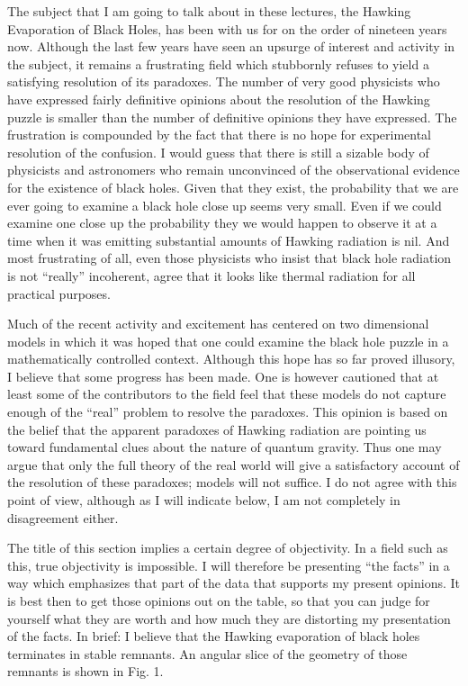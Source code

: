 The subject that I am going to talk about in these lectures, the Hawking
Evaporation of Black Holes, has been with us
for on the order of nineteen years now.  Although the last few years have seen
an upsurge of interest and activity in the subject, it remains a frustrating
field which stubbornly refuses to yield a satisfying resolution of its
paradoxes.
The number of very good physicists who have expressed fairly definitive
opinions
about the resolution of the Hawking puzzle is smaller than the number of
definitive opinions they have expressed.  The frustration is compounded
by the fact that there is no hope for experimental resolution of the confusion.
I would guess that there is still a sizable body of physicists and astronomers
who remain unconvinced of the observational evidence for the existence of
black holes.  Given that they exist, the probability that we are ever
going to examine a black hole close up seems very small.  Even if we could
examine
one close up the probability they we would happen to observe it at a time when
it was emitting substantial amounts of Hawking radiation is nil.  And most
frustrating of
all, even those physicists who insist that black hole radiation is not
 ``really''
incoherent, agree that it looks like thermal radiation for all practical
purposes.

Much of the recent activity and excitement has centered on two dimensional
models
in which it was hoped that one could examine the black hole puzzle in a
mathematically
controlled context.  Although this hope has so far proved illusory, I believe
that some progress has been made.  One is however cautioned that at least some
of the contributors to the field feel that these models do not capture
enough of the ``real'' problem to resolve the paradoxes.  This opinion is based
on the belief that the apparent paradoxes of Hawking radiation are pointing us
toward fundamental clues about the nature of quantum gravity.  Thus one may
argue
that only the full theory of the real world will give a satisfactory account
of the resolution of these paradoxes; models will not suffice.
I do not agree with this point of view, although as I will indicate below,
I am not completely in disagreement either.

The title of this section implies a certain degree of objectivity.  In a field
such as this, true objectivity is impossible.  I will therefore be presenting
``the facts'' in a way which emphasizes that part of the data that supports
my present opinions.  It is best then to get those opinions out on the table,
so
that you can judge for yourself what they are worth and how
much they are distorting my presentation of the facts.  In brief: I believe
that the
Hawking evaporation of black holes terminates in stable remnants.
An angular slice of the geometry
of those remnants is shown in Fig. 1.

